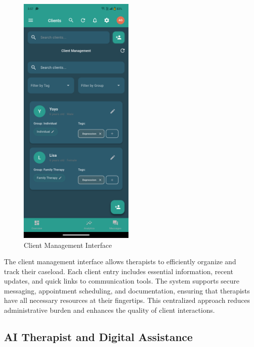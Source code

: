 ﻿\documentclass[12pt,a4paper]{article}
\newcommand{\sectiontitle}[1]{\subsection{#1}}
\begin{document}
\begin{figure}[H]
    \centering
    \includegraphics[width=0.5\textwidth]{Screenshots/clientmanagement.png}
    \caption{Client Management Interface}
    \label{fig:client-management}
\end{figure}
The client management interface allows therapists to efficiently organize and track their caseload. Each client entry includes essential information, recent updates, and quick links to communication tools. The system supports secure messaging, appointment scheduling, and documentation, ensuring that therapists have all necessary resources at their fingertips. This centralized approach reduces administrative burden and enhances the quality of client interactions.

\sectiontitle{AI Therapist and Digital Assistance}
\end{document}
